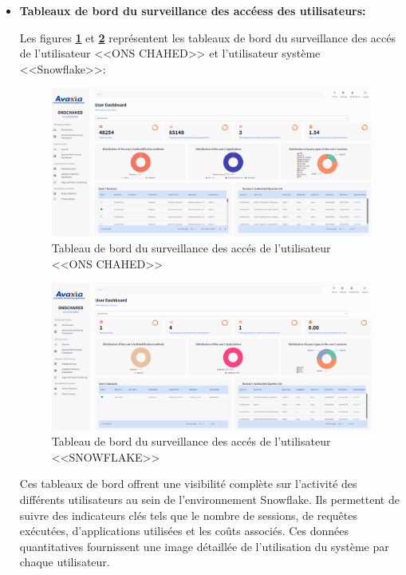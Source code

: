 \begin{itemize}
            \item \textbf{Tableaux de bord du surveillance des accéess des utilisateurs:}
             \par Les figures \textbf{\ref{fig:acess1}} et \textbf{\ref{fig:acess2}} représentent les tableaux de bord du surveillance des accés de l'utilisateur <<ONS CHAHED>> et l'utilisateur système <<Snowflake>>:
             \begin{figure}[H]
                \centering
                \includegraphics[width =1\linewidth]{img/captures/user/1.png}
                \caption{Tableau de bord du surveillance des accés de l'utilisateur <<ONS CHAHED>>}
                    \label{fig:acess1}
                \end{figure}
                \begin{figure}[H]
                    \centering
                    \includegraphics[width =1\linewidth]{img/captures/user/2.png}
                    \caption{Tableau de bord du surveillance des accés de l'utilisateur <<SNOWFLAKE>>}
                        \label{fig:acess2}
                    \end{figure}
                \par Ces tableaux de bord offrent une visibilité complète sur l'activité des différents utilisateurs au sein de l'environnement Snowflake. Ils permettent de suivre des indicateurs clés tels que le nombre de sessions, de requêtes exécutées, d'applications utilisées et les coûts associés. Ces données quantitatives fournissent une image détaillée de l'utilisation du système par chaque utilisateur.

\end{itemize}
